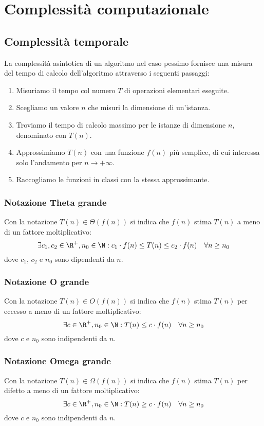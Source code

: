 \documentclass[\main/main.tex]{subfiles}
\begin{document}
\chapter{Complessità computazionale}

\section{Complessità temporale}
La complessità asintotica di un algoritmo nel caso pessimo fornisce una misura del tempo di calcolo dell'algoritmo attraverso i seguenti passaggi:
\begin{enumerate}
  \item Misuriamo il tempo col numero \(T\) di operazioni elementari eseguite.
  \item Scegliamo un valore \(n\) che misuri la dimensione di un'istanza.
  \item Troviamo il tempo di calcolo massimo per le istanze di dimensione \(n\), denominato con \(T(n)\).
  \item Approssimiamo \(T(n)\) con una funzione \(f(n)\) più semplice, di cui interessa solo l'andamento per \(n\rightarrow + \infty \).
  \item Raccogliamo le funzioni in classi con la stessa approssimante.
\end{enumerate}

\subsection{Notazione Theta grande}
Con la notazione \(T(n) \in \Theta(f(n)) \) si indica che \(f(n)\) stima \(T(n)\) a meno di un fattore moltiplicativo:
\[
  \exists c_1, c_2 \in \R^+, n_0 \in \N: c_1 \cdot f(n) \leq T(n) \leq c_2 \cdot f(n) \quad \forall n \geq n_0
\]
dove \(c_1\), \(c_2\) e \(n_0\) sono dipendenti da \(n\).

\subsection{Notazione O grande}
Con la notazione \(T(n) \in O(f(n))\) si indica che \(f(n)\) stima \(T(n)\) per eccesso a meno di un fattore moltiplicativo:
\[
  \exists c \in \R^+, n_0 \in \N: T(n) \leq c\cdot f(n) \quad \forall n \geq n_0
\]
dove \(c\) e \(n_0\) sono indipendenti da \(n\).

\subsection{Notazione Omega grande}
Con la notazione \(T(n) \in \Omega(f(n))\) si indica che \(f(n)\) stima \(T(n)\) per difetto a meno di un fattore moltiplicativo:
\[
  \exists c \in \R^+, n_0 \in \N: T(n) \geq c\cdot f(n) \quad \forall n \geq n_0
\]
dove \(c\) e \(n_0\) sono indipendenti da \(n\).
\end{document}
